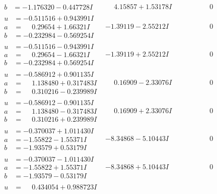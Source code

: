 \documentclass[1p]{elsarticle_modified}
\theoremstyle{definition}
\begin{document}
$$\begin{array}{c|c|c}
\begin{aligned}
b &= -1.176320 - 0.447728 I\end{aligned}
 & \phantom{-}4.15857 + 1.53178 I & \phantom{-0.000000 } 0 \\ \hline\begin{aligned}
u &= -0.511516 + 0.943991 I \\
a &= \phantom{-}0.29654 + 1.66321 I \\
b &= -0.232984 - 0.569254 I\end{aligned}
 & -1.39119 - 2.55212 I & \phantom{-0.000000 } 0 \\ \hline\begin{aligned}
u &= -0.511516 - 0.943991 I \\
a &= \phantom{-}0.29654 - 1.66321 I \\
b &= -0.232984 + 0.569254 I\end{aligned}
 & -1.39119 + 2.55212 I & \phantom{-0.000000 } 0 \\ \hline\begin{aligned}
u &= -0.586912 + 0.901135 I \\
a &= \phantom{-}1.138480 + 0.317483 I \\
b &= \phantom{-}0.310216 - 0.239989 I\end{aligned}
 & \phantom{-}0.16909 - 2.33076 I & \phantom{-0.000000 } 0 \\ \hline\begin{aligned}
u &= -0.586912 - 0.901135 I \\
a &= \phantom{-}1.138480 - 0.317483 I \\
b &= \phantom{-}0.310216 + 0.239989 I\end{aligned}
 & \phantom{-}0.16909 + 2.33076 I & \phantom{-0.000000 } 0 \\ \hline\begin{aligned}
u &= -0.370037 + 1.011430 I \\
a &= -1.55822 - 1.55371 I \\
b &= -1.93579 + 0.53179 I\end{aligned}
 & -8.34868 - 5.10443 I & \phantom{-0.000000 } 0 \\ \hline\begin{aligned}
u &= -0.370037 - 1.011430 I \\
a &= -1.55822 + 1.55371 I \\
b &= -1.93579 - 0.53179 I\end{aligned}
 & -8.34868 + 5.10443 I & \phantom{-0.000000 } 0 \\ \hline\begin{aligned}
u &= \phantom{-}0.434054 + 0.988723 I \\

\end{aligned}
\end{array}$$
\end{document}
